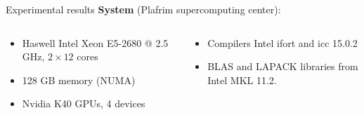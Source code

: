 \begin{frame}{Experimental results}
  {\bf System } (Plafrim supercomputing center):

  \begin{columns}
    \begin{column}{0.5\textwidth}

      
      \begin{itemize}
      \item Haswell Intel Xeon E5-2680 @ 2.5 GHz, $2\times 12$ cores
      \item 128 GB memory (NUMA)
      \item Nvidia K40 GPUs, 4 devices
      \end{itemize}

    \end{column}
    \begin{column}{0.5\textwidth}
        
        \begin{itemize}
        \item Compilers Intel ifort and icc 15.0.2
        \item BLAS and LAPACK libraries from Intel MKL 11.2.
        \end{itemize}
    \end{column}
  \end{columns}


\end{frame}
